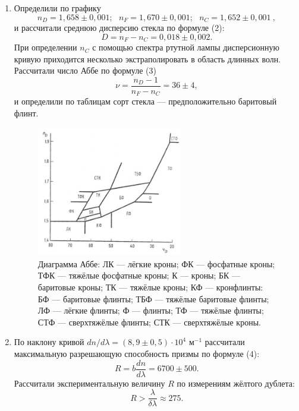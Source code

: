 \documentclass[a4paper, 12pt]{article}%
\begin{document}
\begin{enumerate}
	\item Определили по графику 
	\begin{equation*}
	n_D = 1{,}658\pm0{,}001;\ \ \ n_F = 1{,}670\pm0{,}001;\ \ \ n_C = 1{,}652\pm0{,}001\ ,
	\end{equation*}
	и рассчитали среднюю дисперсию стекла по формуле (2):
	\begin{equation*}
		D = n_F - n_C = 0{,}018\pm0{,}002.
	\end{equation*}
	При определении $n_C$ с помощью спектра ртутной лампы дисперсионную кривую приходится несколько экстраполировать в область длинных волн. Рассчитали число Аббе по формуле (3)
	\begin{equation*}
	\nu = \dfrac{n_D - 1}{n_F - n_C} = 36\pm 4,
	\end{equation*}
	 и определили по таблицам сорт стекла --- предположительно баритовый флинт.
	 	\begin{figure}[h]
	 	\begin{center}
	 		\includegraphics[width = 0.6\textwidth]{pic/443-4.jpg}
	 		\caption{\small{Диаграмма Аббе: ЛК — лёгкие кроны; ФК — фосфатные кроны; ТФК — тяжёлые фосфатные кроны; К — кроны; БК — баритовые кроны; ТК — тяжёлые кроны; КФ — кронфлинты: БФ — баритовые флинты; ТБФ — тяжёлые баритовые флинты; ЛФ — лёгкие флинты; Ф — флинты; ТФ — тяжёлые флинты; СТФ — сверхтяжёлые флинты; СТК — сверхтяжёлые кроны.}}
	 	\end{center}
	 \end{figure}
	\item По наклону кривой $dn/d\lambda = (8{,}9\pm0{,}5)\cdot10^{4}\text{ м}^{-1
	}$  рассчитали максимальную разрешающую способность призмы по формуле (4):
	\begin{equation*}
	R = b\dfrac{dn}{d\lambda} = 6700\pm500.
	\end{equation*}
	Рассчитали экспериментальную величину $R$ по измерениям жёлтого дублета:
	\begin{equation*}
	R > \dfrac{\lambda}{\delta\lambda} \approx 275.
	\end{equation*}
	

\end{enumerate}
\end{document}
